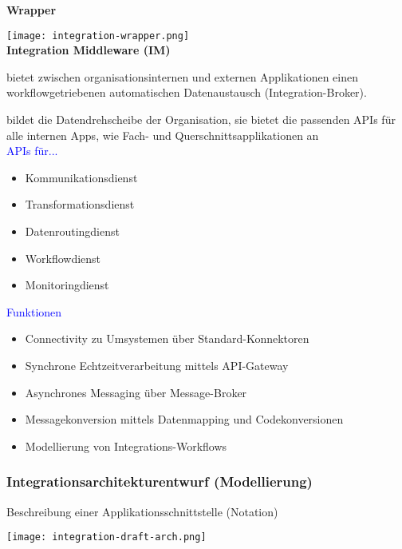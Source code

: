 \columnbreak
\textbf{Wrapper}

\texttt{[image: integration-wrapper.png]} \\

\textbf{Integration Middleware (IM)}

bietet zwischen organisationsinternen und externen Applikationen einen workflowgetriebenen automatischen Datenaustausch (Integration-Broker).

bildet die Datendrehscheibe der Organisation, sie bietet die passenden APIs für alle internen Apps, wie Fach- und Querschnittsapplikationen an \\

\textcolor{blue}{APIs für...}

\begin{itemize}
    \item Kommunikationsdienst
    \item Transformationsdienst
    \item Datenroutingdienst
    \item Workflowdienst
    \item Monitoringdienst
\end{itemize}
\vspace{10pt}
\textcolor{blue}{Funktionen}

\begin{itemize}
    \item Connectivity zu Umsystemen über Standard-Konnektoren
    \item Synchrone Echtzeitverarbeitung mittels API-Gateway
    \item Asynchrones Messaging über Message-Broker
    \item Messagekonversion mittels Datenmapping und Codekonversionen
    \item Modellierung von Integrations-Workflows
\end{itemize}

\subsubsection{Integrationsarchitekturentwurf (Modellierung)}

Beschreibung einer Applikationsschnittstelle (Notation)

\texttt{[image: integration-draft-arch.png]}

